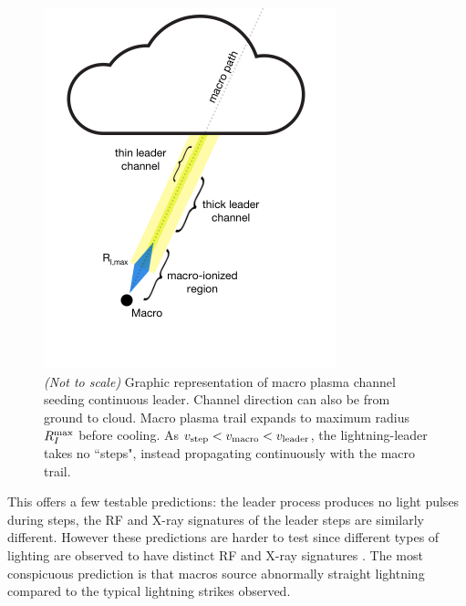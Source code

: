 \documentclass[%
 reprint,
 amsmath,amssymb,
 aps,
]{revtex4-2}
\begin{document}
        \begin{figure}[ht]
            \centering
            \includegraphics[width=\linewidth]{macro_schematic/macro_schematic.pdf}
            \caption{\textit{(Not to scale)} Graphic representation of macro plasma channel seeding continuous leader. Channel direction can also be from ground to cloud. Macro plasma trail expands to maximum radius $R_{I}^{\rm{max}}$ before cooling. As $v_{\rm{step}} < v_{\rm{macro}} < v_{\rm{leader}}$, the lightning-leader takes no ``steps", instead propagating continuously with the macro trail.}
            \label{fig:macro_graphic}
        \end{figure}

        This offers a few testable predictions: the leader process produces no light pulses during steps, the RF and X-ray signatures of the leader steps are similarly different. However these predictions are harder to test since different types of lighting are observed to have distinct RF and X-ray signatures \cite{Hare2020}. The most conspicuous prediction is that {macros source abnormally straight lightning} compared to the typical lightning strikes observed.
\end{document}
